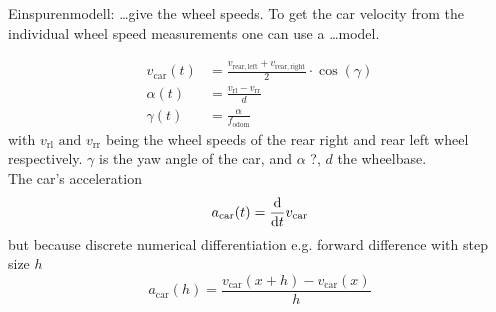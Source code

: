 Einspurenmodell:
\dots give the wheel speeds. To get the car velocity from the individual wheel speed measurements one can use a \dots model.

\begin{align}
    v_\mathrm{car}(t) &= \frac{v_\mathrm{rear,left} + v_\mathrm{rear,right}}{2}\cdot\cos(\gamma) \\
    \alpha(t) &= \frac{v_\mathrm{rl} - v_\mathrm{rr}}{d} \\
    \gamma(t) &= \frac{\alpha}{f_\mathrm{odom}}
\end{align}
with $v_\mathrm{rl} \text{ and } v_\mathrm{rr}$ being the wheel speeds of the rear right and rear left wheel respectively. $\gamma$ is the yaw angle of the car, and $\alpha$ ?, $d$ the wheelbase.\\
The car's acceleration
\begin{equation}
    a_\mathrm{car}(t) = \dv{t}v_\mathrm{car}
\end{equation}
but because discrete numerical differentiation e.g. forward difference with step size $h$
\begin{equation}
    a_\mathrm{car}(h) = \frac{v_\mathrm{car}(x + h) - v_\mathrm{car}(x)}{h}
\end{equation}

